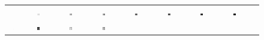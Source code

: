 \documentclass[a4paper,10pt]{article}
\begin{document}
\begin{figure}
\begin{tabular}{ccccccccc}
&
\includegraphics[width=0.1055\textwidth]{images/deep_star}\!\!\!\!\!\!
&
\includegraphics[width=0.1055\textwidth]{images/deep_jiep}\!\!\!\!\!\!
&
\includegraphics[width=0.1055\textwidth]{images/deep_lime}\!\!\!\!\!\!
&
\includegraphics[width=0.1055\textwidth]{images/deep_msr}\!\!\!\!\!\!
&
\includegraphics[width=0.1055\textwidth]{images/deep_N4}\!\!\!\!\!\!
&
\includegraphics[width=0.1055\textwidth]{images/deep_pie}\!\!\!\!\!\!
&
\includegraphics[width=0.1055\textwidth]{images/deep_srie}%
\\
\includegraphics[width=0.1055\textwidth]{images/lumbar1_gray}\!\!\!\!\!\!
&
\includegraphics[width=0.1055\textwidth]{images/lumbar1_R_7_1_0p5}\!\!\!\!\!\!
&
\includegraphics[width=0.1055\textwidth]{images/lumbar1_star}\!\!\!\!\!\!
&
\includegraphics[width=0.1055\textwidth]{images/lumbar1_jiep}\!\!\!\!\!\!

\end{tabular}
\end{figure}
\end{document}

